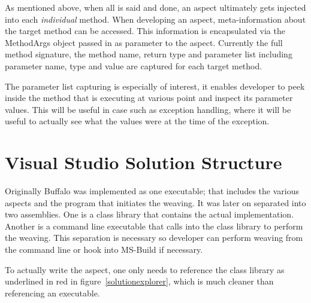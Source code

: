 As mentioned above, when all is said and done, an aspect ultimately gets injected into each \textit{individual} method. When developing an aspect, meta-information about the target method can be accessed. This information is encapsulated via the MethodArgs object passed in as parameter to the aspect. Currently the full method signature, the method name, return type and parameter list including parameter name, type and value are captured for each target method.

The parameter list capturing is especially of interest, it enables developer to peek inside the method that is executing at various point and inspect its parameter values. This will be useful in case such as exception handling, where it will be useful to actually see what the values were at the time of the exception.

\section{Visual Studio Solution Structure}

Originally Buffalo was implemented as one executable; that includes the various aspects and the program that initiates the weaving. It was later on separated into two assemblies. One is a class library that contains the actual implementation. Another is a command line executable that calls into the class library to perform the weaving. This separation is necessary so developer can perform weaving from the command line or hook into MS-Build if necessary. 

To actually write the aspect, one only needs to reference the class library as underlined in red in figure~\ref{solutionexplorer}, which is much cleaner than referencing an executable.

